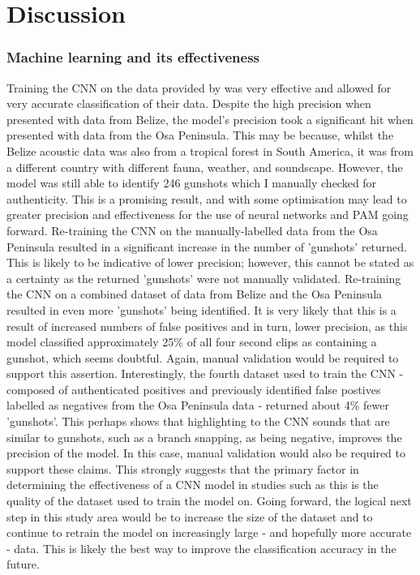 
\chapter{Discussion} %

\label{Discussion} %

\subsection{Machine learning and its effectiveness}
Training the CNN on the data provided by \cite{Hill2018} was very effective and allowed for very accurate classification of their data. Despite the high precision when presented with data from Belize, the model's precision took a significant hit when presented with data from the Osa Peninsula. This may be because, whilst the Belize acoustic data was also from a tropical forest in South America, it was from a different country with different fauna, weather, and soundscape. However, the model was still able to identify 246 gunshots which I manually checked for authenticity. This is a promising result, and with some optimisation may lead to greater precision and effectiveness for the use of neural networks and PAM going forward. Re-training the CNN on the manually-labelled data from the Osa Peninsula resulted in a significant increase in the number of 'gunshots' returned. This is likely to be indicative of lower precision; however, this cannot be stated as a certainty as the returned 'gunshots' were not manually validated. Re-training the CNN on a combined dataset of data from Belize and the Osa Peninsula resulted in even more 'gunshots' being identified. It is very likely that this is a result of increased numbers of false positives and in turn, lower precision, as this model classified approximately 25\% of all four second clips as containing a gunshot, which seems doubtful. Again, manual validation would be required to support this assertion. Interestingly, the fourth dataset used to train the CNN - composed of authenticated positives and previously identified false postives labelled as negatives from the Osa Peninsula data - returned about 4\% fewer 'gunshots'. This perhaps shows that highlighting to the CNN sounds that are similar to gunshots, such as a branch snapping, as being negative, improves the precision of the model. In this case, manual validation would also be required to support these claims. This strongly suggests that the primary factor in determining the effectiveness of a CNN model in studies such as this is the quality of the dataset used to train the model on. Going forward, the logical next step in this study area would be to increase the size of the dataset and to continue to retrain the model on increasingly large - and hopefully more accurate - data. This is likely the best way to improve the classification accuracy in the future.



